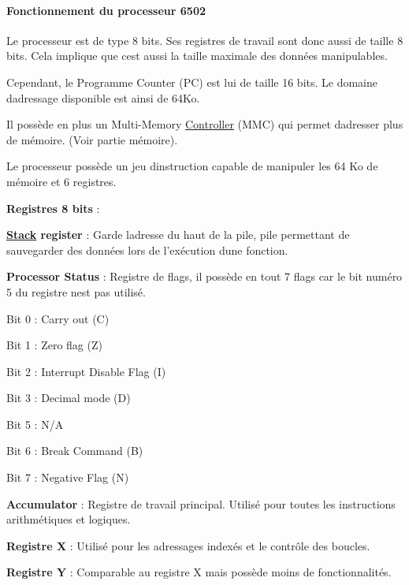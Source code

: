 \paragraph*{Fonctionnement du processeur 6502}

Le processeur est de type 8 bits. Ses registres de travail sont donc aussi de taille 8 bits. Cela implique que c\textquotesingle{}est aussi la taille maximale des données manipulables.

Cependant, le Programme Counter (PC) est lui de taille 16 bits. Le domaine d\textquotesingle{}adressage disponible est ainsi de 64\+Ko.

Il possède en plus un Multi-\/\+Memory \hyperlink{struct_controller}{Controller} (M\+MC) qui permet d\textquotesingle{}adresser plus de mémoire. (Voir partie mémoire).

Le processeur possède un jeu d\textquotesingle{}instruction capable de manipuler les 64 Ko de mémoire et 6 registres.

{\bfseries Registres 8 bits} \+:
\begin{DoxyItemize}
\item {\bfseries \hyperlink{struct_stack}{Stack} register} \+: Garde l\textquotesingle{}adresse du haut de la pile, pile permettant de sauvegarder des données lors de l’exécution d\textquotesingle{}une fonction.
\item {\bfseries Processor Status} \+: Registre de flags, il possède en tout 7 flags car le bit numéro 5 du registre n\textquotesingle{}est pas utilisé.
\begin{DoxyItemize}
\item Bit 0 \+: Carry out (C)
\item Bit 1 \+: Zero flag (Z)
\item Bit 2 \+: Interrupt Disable Flag (I)
\item Bit 3 \+: Decimal mode (D)
\item Bit 5 \+: N/A
\item Bit 6 \+: Break Command (B)
\item Bit 7 \+: Negative Flag (N)
\end{DoxyItemize}
\item {\bfseries Accumulator} \+: Registre de travail principal. Utilisé pour toutes les instructions arithmétiques et logiques.
\item {\bfseries Registre X} \+: Utilisé pour les adressages indexés et le contrôle des boucles.
\item {\bfseries Registre Y} \+: Comparable au registre X mais possède moins de fonctionnalités.
\end{DoxyItemize}

